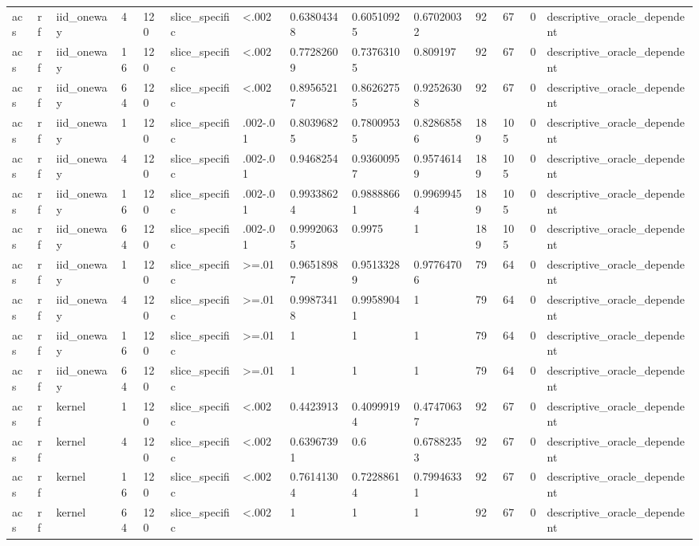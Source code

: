 \begin{tabular}{llllllllllllll}
acs & rf & iid\_oneway & 4 & 120 & slice\_specific & <.002 & 0.63804348 & 0.60510925 & 0.67020032 & 92 & 67 & 0 & descriptive\_oracle\_dependent \\
acs & rf & iid\_oneway & 16 & 120 & slice\_specific & <.002 & 0.77282609 & 0.73763105 & 0.809197 & 92 & 67 & 0 & descriptive\_oracle\_dependent \\
acs & rf & iid\_oneway & 64 & 120 & slice\_specific & <.002 & 0.89565217 & 0.86262755 & 0.92526308 & 92 & 67 & 0 & descriptive\_oracle\_dependent \\
acs & rf & iid\_oneway & 1 & 120 & slice\_specific & .002-.01 & 0.80396825 & 0.78009535 & 0.82868586 & 189 & 105 & 0 & descriptive\_oracle\_dependent \\
acs & rf & iid\_oneway & 4 & 120 & slice\_specific & .002-.01 & 0.9468254 & 0.93600957 & 0.95746149 & 189 & 105 & 0 & descriptive\_oracle\_dependent \\
acs & rf & iid\_oneway & 16 & 120 & slice\_specific & .002-.01 & 0.99338624 & 0.98888661 & 0.99699454 & 189 & 105 & 0 & descriptive\_oracle\_dependent \\
acs & rf & iid\_oneway & 64 & 120 & slice\_specific & .002-.01 & 0.99920635 & 0.9975 & 1 & 189 & 105 & 0 & descriptive\_oracle\_dependent \\
acs & rf & iid\_oneway & 1 & 120 & slice\_specific & >=.01 & 0.96518987 & 0.95133289 & 0.97764706 & 79 & 64 & 0 & descriptive\_oracle\_dependent \\
acs & rf & iid\_oneway & 4 & 120 & slice\_specific & >=.01 & 0.99873418 & 0.99589041 & 1 & 79 & 64 & 0 & descriptive\_oracle\_dependent \\
acs & rf & iid\_oneway & 16 & 120 & slice\_specific & >=.01 & 1 & 1 & 1 & 79 & 64 & 0 & descriptive\_oracle\_dependent \\
acs & rf & iid\_oneway & 64 & 120 & slice\_specific & >=.01 & 1 & 1 & 1 & 79 & 64 & 0 & descriptive\_oracle\_dependent \\
acs & rf & kernel & 1 & 120 & slice\_specific & <.002 & 0.4423913 & 0.40999194 & 0.47470637 & 92 & 67 & 0 & descriptive\_oracle\_dependent \\
acs & rf & kernel & 4 & 120 & slice\_specific & <.002 & 0.63967391 & 0.6 & 0.67882353 & 92 & 67 & 0 & descriptive\_oracle\_dependent \\
acs & rf & kernel & 16 & 120 & slice\_specific & <.002 & 0.76141304 & 0.72288614 & 0.79946331 & 92 & 67 & 0 & descriptive\_oracle\_dependent \\
acs & rf & kernel & 64 & 120 & slice\_specific & <.002 & 1 & 1 & 1 & 92 & 67 & 0 & descriptive\_oracle\_dependent \\

\end{tabular}
